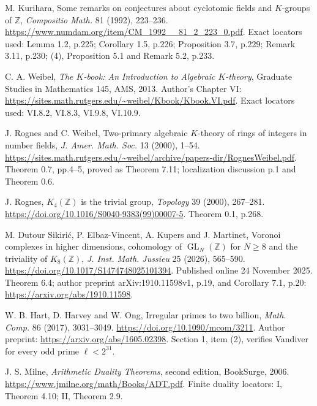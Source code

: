 
M. Kurihara,
Some remarks on conjectures about cyclotomic fields and \(K\)-groups of \(\mathbb Z\),
\emph{Compositio Math.} 81 (1992), 223--236.
\url{https://www.numdam.org/item/CM_1992__81_2_223_0.pdf}.
Exact locators used: Lemma 1.2, p.225; Corollary 1.5, p.226;
Proposition 3.7, p.229; Remark 3.11, p.230;
(4), Proposition 5.1 and Remark 5.2, p.233.

C. A. Weibel,
\emph{The \(K\)-book: An Introduction to Algebraic \(K\)-theory},
Graduate Studies in Mathematics 145, AMS, 2013.
Author's Chapter VI:
\url{https://sites.math.rutgers.edu/~weibel/Kbook/Kbook.VI.pdf}.
Exact locators used: VI.8.2, VI.8.3, VI.9.8, VI.10.9.

J. Rognes and C. Weibel,
Two-primary algebraic \(K\)-theory of rings of integers in number fields,
\emph{J. Amer. Math. Soc.} 13 (2000), 1--54.
\url{https://sites.math.rutgers.edu/~weibel/archive/papers-dir/RognesWeibel.pdf}.
Theorem 0.7, pp.4--5, proved as Theorem 7.11;
localization discussion p.1 and Theorem 0.6.

J. Rognes, \(K_4(\mathbb Z)\) is the trivial group,
\emph{Topology} 39 (2000), 267--281.
\url{https://doi.org/10.1016/S0040-9383(99)00007-5}.
Theorem 0.1, p.268.

M. Dutour Sikiri\'c, P. Elbaz-Vincent, A. Kupers and J. Martinet,
Voronoi complexes in higher dimensions, cohomology of
\(\operatorname{GL}_N(\mathbb Z)\) for \(N\ge8\) and the triviality of
\(K_8(\mathbb Z)\),
\emph{J. Inst. Math. Jussieu} 25 (2026), 565--590.
\url{https://doi.org/10.1017/S1474748025101394}.
Published online 24 November 2025.
Theorem 6.4; author preprint arXiv:1910.11598v1, p.19,
and Corollary 7.1, p.20:
\url{https://arxiv.org/abs/1910.11598}.

W. B. Hart, D. Harvey and W. Ong,
Irregular primes to two billion,
\emph{Math. Comp.} 86 (2017), 3031--3049.
\url{https://doi.org/10.1090/mcom/3211}.
Author preprint:
\url{https://arxiv.org/abs/1605.02398}.
Section 1, item (2), verifies Vandiver for every odd prime
\(\ell<2^{31}\).

J. S. Milne, \emph{Arithmetic Duality Theorems},
second edition, BookSurge, 2006.
\url{https://www.jmilne.org/math/Books/ADT.pdf}.
Finite duality locators: I, Theorem 4.10; II, Theorem 2.9.

